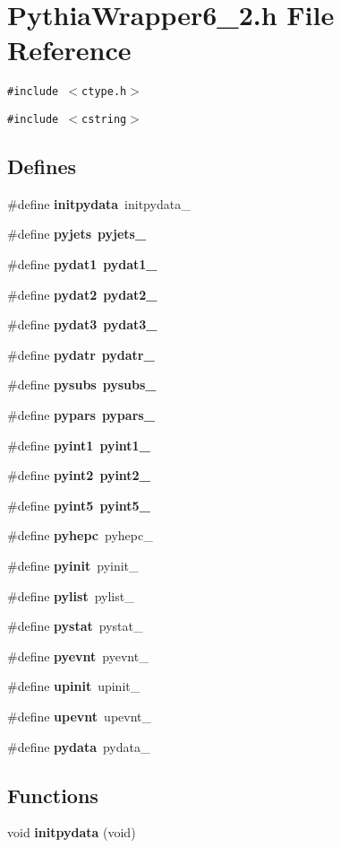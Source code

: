 \section{Pythia\-Wrapper6\_\-2.h File Reference}
\label{PythiaWrapper6__2_8h}
{\tt \#include $<$ctype.h$>$}\par
{\tt \#include $<$cstring$>$}\par
\subsection*{Defines}
\begin{CompactItemize}
\item 
\#define {\bf initpydata}~initpydata\_\-
\item 
\#define {\bf pyjets}~{\bf pyjets\_\-}
\item 
\#define {\bf pydat1}~{\bf pydat1\_\-}
\item 
\#define {\bf pydat2}~{\bf pydat2\_\-}
\item 
\#define {\bf pydat3}~{\bf pydat3\_\-}
\item 
\#define {\bf pydatr}~{\bf pydatr\_\-}
\item 
\#define {\bf pysubs}~{\bf pysubs\_\-}
\item 
\#define {\bf pypars}~{\bf pypars\_\-}
\item 
\#define {\bf pyint1}~{\bf pyint1\_\-}
\item 
\#define {\bf pyint2}~{\bf pyint2\_\-}
\item 
\#define {\bf pyint5}~{\bf pyint5\_\-}
\item 
\#define {\bf pyhepc}~pyhepc\_\-
\item 
\#define {\bf pyinit}~pyinit\_\-
\item 
\#define {\bf pylist}~pylist\_\-
\item 
\#define {\bf pystat}~pystat\_\-
\item 
\#define {\bf pyevnt}~pyevnt\_\-
\item 
\#define {\bf upinit}~upinit\_\-
\item 
\#define {\bf upevnt}~upevnt\_\-
\item 
\#define {\bf pydata}~pydata\_\-
\end{CompactItemize}
\subsection*{Functions}
\begin{CompactItemize}
\item 
void {\bf initpydata} (void)
\end{CompactItemize}
